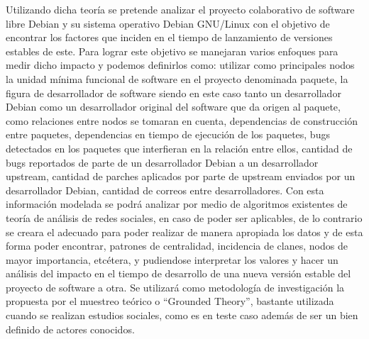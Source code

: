\documentclass[12pt]{report}
\begin{document}
Utilizando dicha teoría se  pretende analizar el proyecto colaborativo
de software libre  Debian y su sistema operativo  Debian GNU/Linux con
el objetivo  de encontrar  los factores  que inciden  en el  tiempo de
lanzamiento de versiones estables de  este.  Para lograr este objetivo
se  manejaran  varios enfoques  para  medir  dicho impacto  y  podemos
definirlos  como: utilizar  como  principales nodos  la unidad  mínima
funcional de software en el  proyecto denominada paquete, la figura de
desarrollador de software  siendo en este caso  tanto un desarrollador
Debian como  un desarrollador original  del software que da  origen al
paquete,   como  relaciones   entre  nodos   se  tomaran   en  cuenta,
dependencias de construcción entre paquetes, dependencias en tiempo de
ejecución  de  los  paquetes,  bugs detectados  en  los  paquetes  que
interfieran en la relación entre ellos, cantidad de bugs reportados de
parte de un desarrollador Debian  a un desarrollador upstream, cantidad
de  parches   aplicados  por  parte   de  upstream  enviados   por  un
desarrollador Debian, cantidad de  correos entre desarrolladores.  Con
esta información  modelada se podrá  analizar por medio  de algoritmos
existentes de teoría  de análisis de redes sociales, en  caso de poder
ser  aplicables, de  lo contrario  se  creara el  adecuado para  poder
realizar  de  manera  apropiada  los  datos  y  de  esta  forma  poder
encontrar,  patrones de  centralidad, incidencia  de clanes,  nodos de
mayor  importancia,  etcétera,  y  pudiendose interpretar los
valores y hacer un análisis del  impacto en el tiempo de desarrollo de
una  nueva  versión estable  del  proyecto  de  software a  otra.   Se
utilizará  como metodología  de  investigación la propuesta por  el
muestreo  teórico o  ``Grounded Theory'', bastante utilizada cuando se 
realizan estudios sociales, como es en teste caso además de ser un bien
definido de actores conocidos.
\end{document}
